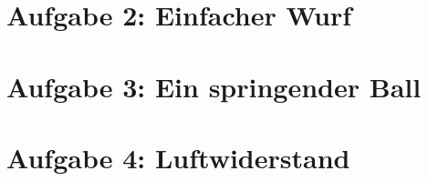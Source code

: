 \documentclass{article}
\begin{document}
\lipsum[1]

\section*{Aufgabe 2: Einfacher Wurf}
\lipsum[2]

\section*{Aufgabe 3: Ein springender Ball}
\lipsum[3]

\section*{Aufgabe 4: Luftwiderstand}
\lipsum[4]
\end{document}
